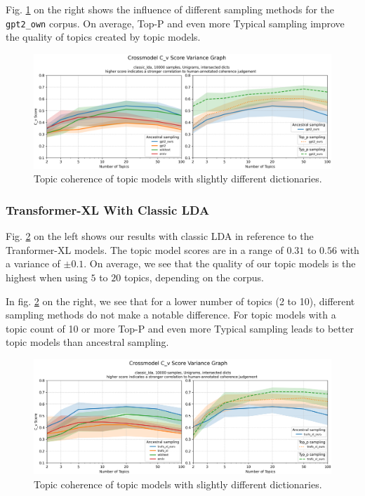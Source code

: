 Fig. \ref{fig:Unigrams-10000-crossmodel-cv-var-classic_lda-gpt2+nt-is} on the right shows the influence of different sampling methods for the \texttt{gpt2\_own} corpus. On average, Top-P and even more Typical sampling improve the quality of topics created by topic models.
\begin{figure}[H]
    \centering
    \includegraphics[width=1\textwidth]{figures/Unigrams-10000-crossmodel-cv-var-classic_lda-gpt2+nt-is}
    \caption{Topic coherence of topic models with slightly different dictionaries.}
    \label{fig:Unigrams-10000-crossmodel-cv-var-classic_lda-gpt2+nt-is}
\end{figure}

\subsubsection{Transformer-XL With Classic LDA}
Fig. \ref{fig:Unigrams-10000-crossmodel-cv-var-classic_lda-trafo_xl+nt-is} on the left shows our results with classic LDA in reference to the Tranformer-XL models. The topic model scores are in a range of $0.31$ to $0.56$ with a variance of $\pm0.1$. On average, we see that the quality of our topic models is the highest when using $5$ to $20$ topics, depending on the corpus.

In fig. \ref{fig:Unigrams-10000-crossmodel-cv-var-classic_lda-trafo_xl+nt-is} on the right, we see that for a lower number of topics (2 to 10), different sampling methods do not make a notable difference. For topic models with a topic count of 10 or more Top-P and even more Typical sampling leads to better topic models than ancestral sampling.
\begin{figure}[H]
    \centering
    \includegraphics[width=1\textwidth]{figures/Unigrams-10000-crossmodel-cv-var-classic_lda-trafo_xl+nt-is}
    \caption{Topic coherence of topic models with slightly different dictionaries.}
    \label{fig:Unigrams-10000-crossmodel-cv-var-classic_lda-trafo_xl+nt-is}
\end{figure}

